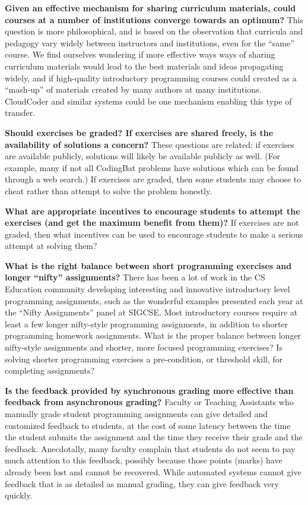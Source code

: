 \documentclass{sig-alternate}
\begin{document}
{\bf Given an effective mechanism for sharing curriculum materials, could
courses at a number of institutions converge towards an optimum?}
This question is more philosophical, and is based on the observation that
curricula and pedagogy vary widely between instructors and institutions,
even for the ``same'' course\cite{Hertz:2010:CCM:1734263.1734335}.  We find ourselves wondering
if more effective ways ways of sharing curriculum materials would lead
to the best materials and ideas propagating widely, and if high-quality introductory
programming courses could created as a ``mash-up'' of materials created by
many authors at many institutions.  CloudCoder and similar systems
could be one mechanism enabling this type of transfer.

{\bf Should exercises be graded?
If exercises are shared freely, is the availability of solutions a concern?}
These questions are related: if exercises are available publicly,
solutions will likely be available publicly as well.  (For example,
many if not all CodingBat problems have solutions which can be found
through a web search.)  If exercises are graded, then some students may
choose to cheat rather than attempt to solve the problem honestly.

{\bf What are appropriate incentives to encourage students to attempt
the exercises (and get the maximum benefit from them)?}
If exercises are not graded, then what incentives can be used to
encourage students to make a serious attempt at solving them?

{\bf What is the right balance between short programming exercises and
  longer ``nifty'' assignments?}
There has been a lot of work in the CS Education community developing
interesting and innovative introductory level programming assignments,
such as the wonderful examples presented each year at the ``Nifty Assignments'' panel at
SIGCSE.  Most introductory courses require at least a few
longer nifty-style programming assignments, in addition to shorter
programming homework assignments.  What is the proper balance between longer
nifty-style assignments and shorter, more focused programming exercises?  Is 
solving shorter programming exercises a pre-condition, or threshold skill, for
completing assignments?  

{\bf Is the feedback provided by synchronous grading more effective
  than feedback from asynchronous grading?}
Faculty or Teaching Assistants who manually grade student programming
assignments can give detailed and customized feedback to
students, at the cost of some latency between the time the student
submits the assignment and the time they receive their grade and the
feedback.  Anecdotally, many faculty complain that students do not
seem to pay much attention to this feedback, possibly because those
points (marks) have already been lost and cannot be recovered.
While automated systems cannot give feedback that is as detailed as manual
grading, they can give feedback very quickly.  
\end{document}
